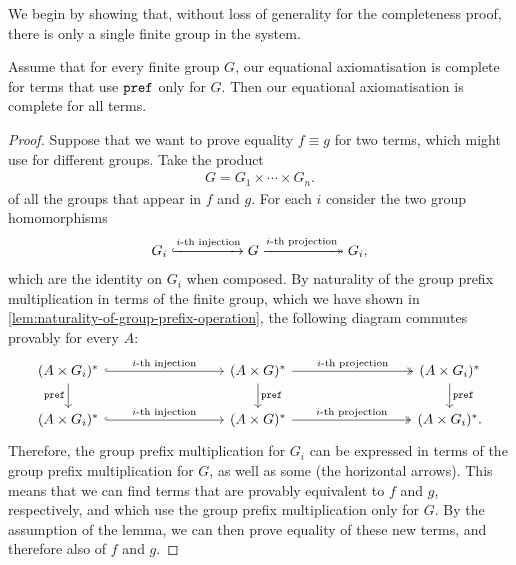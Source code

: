 \label{sec:single-group-suffices}
We begin by showing that, without loss of generality for the completeness proof, there is only a single finite group in the system. 
\begin{lemma}\label{lem:just-one-group}
    Assume that for every finite group $G$, our equational axiomatisation is complete for terms that use $\mathtt{pref}$ only for $G$. Then our equational axiomatisation is complete for all terms.
\end{lemma}
\begin{proof}
    Suppose that we want to prove equality $f \equiv g$ for two terms, which might use  for different groups. Take the product 
    \begin{align*}
    G = G_1 \times \cdots \times G_n.
    \end{align*}
    of all the groups that appear in $f$ and $g$. For each $i$ consider the two group homomorphisms 
    \begin{align*}
    G_i \xhookrightarrow {\text{$i$-th injection}} 
    G \xtwoheadrightarrow {\text{$i$-th projection}}
    G_i,
    \end{align*}
    which are the identity on $G_i$ when composed. By naturality of the group prefix multiplication in terms of the finite group, which we have shown in \cref{lem:naturality-of-group-prefix-operation},  the following diagram commutes provably for every  $A$:
    \[
        \begin{tikzcd}[column sep=3cm]
        (A \times G_i)^*
        \ar[r,hookrightarrow, "{\text{$i$-th injection}}"]
        \ar[d, "\prefterm"']
        &
        (A \times G)^*
        \ar[r,twoheadrightarrow, "{\text{$i$-th projection}}"]
        \ar[d, "\prefterm"]
        &
        (A \times G_i)^* 
        \ar[d, "\prefterm"]
        \\
        (A \times G_i)^*
        \ar[r,hookrightarrow, "{\text{$i$-th injection}}"]
        &
        (A \times G)^*
        \ar[r,twoheadrightarrow, "{\text{$i$-th projection}}"]
        &
        (A \times G_i)^*. 
        \end{tikzcd}
    \]
Therefore, the group prefix multiplication for $G_i$ can be expressed in terms of the group prefix multiplication for $G$, as well as some  (the horizontal arrows). This means that we can find terms that are provably equivalent to $f$ and $g$, respectively, and which use the group prefix multiplication only for $G$. By the  assumption of the lemma, we can then prove equality of these new terms, and therefore also of $f$ and $g$.
\end{proof}

